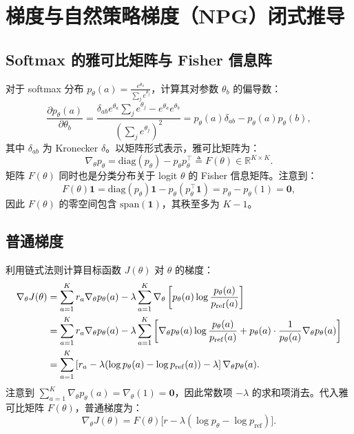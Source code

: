 \documentclass[11pt, a4paper, UTF8]{ctexart}
\begin{document}
\section{梯度与自然策略梯度（NPG）闭式推导}

\subsection{Softmax 的雅可比矩阵与 Fisher 信息阵}

对于 softmax 分布 $p_\theta(a) = \frac{e^{\theta_a}}{\sum_j e^{\theta_j}}$，计算其对参数 $\theta_b$ 的偏导数：
\begin{equation}
    \frac{\partial p_\theta(a)}{\partial \theta_b} = \frac{\delta_{ab} e^{\theta_a} \sum_j e^{\theta_j} - e^{\theta_a} e^{\theta_b}}{\left( \sum_j e^{\theta_j} \right)^2} = p_\theta(a) \delta_{ab} - p_\theta(a) p_\theta(b),
\end{equation}
其中 $\delta_{ab}$ 为 Kronecker $\delta$。以矩阵形式表示，雅可比矩阵为：
\begin{equation}
    \nabla_\theta p_\theta = \mathrm{diag}(p_\theta) - p_\theta p_\theta^\top \triangleq F(\theta) \in \mathbb{R}^{K \times K}.
    \label{eq:fisher}
\end{equation}
矩阵 $F(\theta)$ 同时也是分类分布关于 logit $\theta$ 的 Fisher 信息矩阵。注意到：
\begin{equation}
    F(\theta) \mathbf{1} = \mathrm{diag}(p_\theta)\mathbf{1} - p_\theta (p_\theta^\top \mathbf{1}) = p_\theta - p_\theta (1) = \mathbf{0},
\end{equation}
因此 $F(\theta)$ 的零空间包含 $\mathrm{span}(\mathbf{1})$，其秩至多为 $K-1$。

\subsection{普通梯度}

利用链式法则计算目标函数 $J(\theta)$ 对 $\theta$ 的梯度：
\begin{align}
    \nabla_\theta J(\theta) &= \sum_{a=1}^K r_a \nabla_\theta p_\theta(a) - \lambda \sum_{a=1}^K \nabla_\theta \left[ p_\theta(a) \log \frac{p_\theta(a)}{p_{\mathrm{ref}}(a)} \right] \notag \\
    &= \sum_{a=1}^K r_a \nabla_\theta p_\theta(a) - \lambda \sum_{a=1}^K \left[ \nabla_\theta p_\theta(a) \log \frac{p_\theta(a)}{p_{\mathrm{ref}}(a)} + p_\theta(a) \cdot \frac{1}{p_\theta(a)} \nabla_\theta p_\theta(a) \right] \notag \\
    &= \sum_{a=1}^K \left[ r_a - \lambda (\log p_\theta(a) - \log p_{\mathrm{ref}}(a)) - \lambda \right] \nabla_\theta p_\theta(a).
\end{align}
注意到 $\sum_{a=1}^K \nabla_\theta p_\theta(a) = \nabla_\theta (1) = \mathbf{0}$，因此常数项 $-\lambda$ 的求和项消去。代入雅可比矩阵 $F(\theta)$，普通梯度为：
\begin{equation}
    \nabla_\theta J(\theta) = F(\theta) \Big[ r - \lambda (\log p_\theta - \log p_{\mathrm{ref}}) \Big].
    \label{eq:vanilla_grad}
\end{equation}
\end{document}
